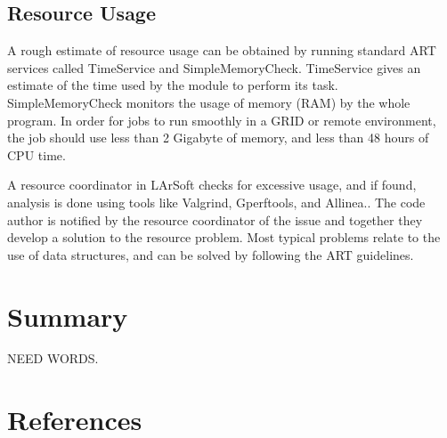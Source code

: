 \documentclass[12pt]{elsarticle}
\begin{document}
\subsection{Resource Usage}

A rough estimate of resource usage can be obtained by running standard ART services called TimeService and SimpleMemoryCheck. TimeService gives an estimate of the time used by the module to perform its task. SimpleMemoryCheck monitors the usage of memory (RAM) by the whole program. In order for jobs to run smoothly in a GRID or remote environment, the job should use less than 2 Gigabyte of memory, and less than 48 hours of CPU time.

A resource coordinator in LArSoft checks for excessive usage, and if found, analysis is done using tools like Valgrind\cite{valgrind}, Gperftools\cite{gperf}, and Allinea.\cite {allinea}.
The code author is notified by the resource coordinator of the issue and together they develop a solution to the resource problem. Most typical problems relate to the use of data structures, and can be solved by following the ART guidelines.\cite{art-guide}
 
\section{Summary}
NEED WORDS.
\section{References}
\end{document}
